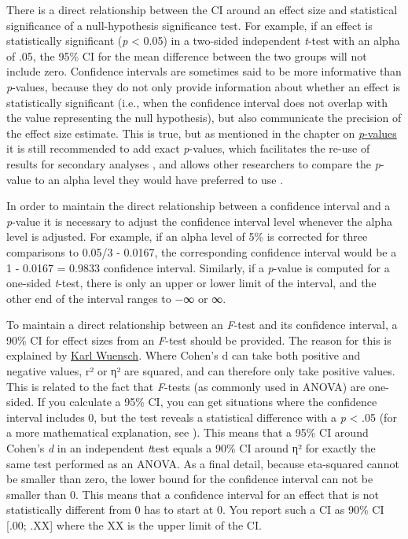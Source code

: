 \documentclass[
  oneside]{book}
\begin{document}
There is a direct relationship between the CI around an effect size and statistical significance of a null-hypothesis significance test. For example, if an effect is statistically significant (\emph{p} \textless{} 0.05) in a two-sided independent \emph{t}-test with an alpha of .05, the 95\% CI for the mean difference between the two groups will not include zero. Confidence intervals are sometimes said to be more informative than \emph{p}-values, because they do not only provide information about whether an effect is statistically significant (i.e., when the confidence interval does not overlap with the value representing the null hypothesis), but also communicate the precision of the effect size estimate. This is true, but as mentioned in the chapter on \href{pvalue}{\emph{p}-values} it is still recommended to add exact \emph{p}-values, which facilitates the re-use of results for secondary analyses \citep{appelbaum_journal_2018}, and allows other researchers to compare the \emph{p}-value to an alpha level they would have preferred to use \citep{lehmann_testing_2005}.

In order to maintain the direct relationship between a confidence interval and a \emph{p}-value it is necessary to adjust the confidence interval level whenever the alpha level is adjusted. For example, if an alpha level of 5\% is corrected for three comparisons to 0.05/3 - 0.0167, the corresponding confidence interval would be a 1 - 0.0167 = 0.9833 confidence interval. Similarly, if a \emph{p}-value is computed for a one-sided \emph{t}-test, there is only an upper or lower limit of the interval, and the other end of the interval ranges to −∞ or ∞.

To maintain a direct relationship between an \emph{F}-test and its confidence interval, a 90\% CI for effect sizes from an \emph{F}-test should be provided. The reason for this is explained by \href{http://core.ecu.edu/psyc/wuenschk/docs30/CI-Eta2-Alpha.doc}{Karl Wuensch}. Where Cohen's d can take both positive and negative values, r² or η² are squared, and can therefore only take positive values. This is related to the fact that \emph{F}-tests (as commonly used in ANOVA) are one-sided. If you calculate a 95\% CI, you can get situations where the confidence interval includes 0, but the test reveals a statistical difference with a \emph{p} \textless{} .05 (for a more mathematical explanation, see \citet{steiger_beyond_2004}). This means that a 95\% CI around Cohen's \emph{d} in an independent \emph{t}test equals a 90\% CI around η² for exactly the same test performed as an ANOVA. As a final detail, because eta-squared cannot be smaller than zero, the lower bound for the confidence interval can not be smaller than 0. This means that a confidence interval for an effect that is not statistically different from 0 has to start at 0. You report such a CI as 90\% CI {[}.00; .XX{]} where the XX is the upper limit of the CI.
\end{document}
